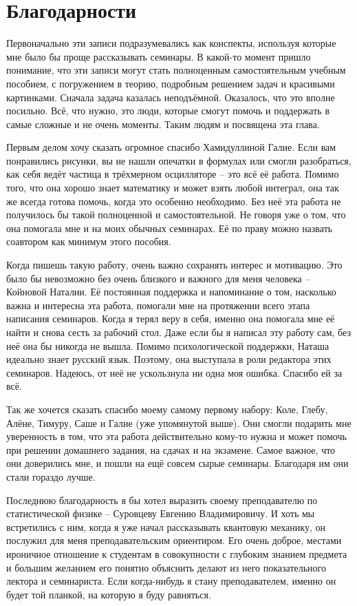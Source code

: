 \section*{Благодарности}

Первоначально эти записи подразумевались как конспекты, используя которые мне
было бы проще рассказывать семинары. В какой-то момент пришло понимание, что
эти записи могут стать полноценным самостоятельным учебным пособием, с
погружением в теорию, подробным решением задач и красивыми картинками. Сначала
задача казалась неподъёмной. Оказалось, что это вполне посильно. Всё, что
нужно, это люди, которые смогут помочь и поддержать в самые сложные и не очень
моменты. Таким людям и посвящена эта глава.

Первым делом хочу сказать огромное спасибо Хамидуллиной Галие. Если вам
понравились рисунки, вы не нашли опечатки в формулах или смогли разобраться,
как себя ведёт частица в трёхмерном осцилляторе -- это всё её работа. Помимо
того, что она хорошо знает математику и может взять любой интеграл, она так же
всегда готова помочь, когда это особенно необходимо. Без неё эта работа не
получилось бы такой полноценной и самостоятельной. Не говоря уже о том, что она
помогала мне и на моих обычных семинарах. Её по праву можно назвать соавтором
как минимум этого пособия.

Когда пишешь такую работу, очень важно сохранять интерес и мотивацию. Это было
бы невозможно без очень близкого и важного для меня человека -- Койновой
Наталии. Её постоянная поддержка и напоминание о том, насколько важна и
интересна эта работа, помогали мне на протяжении всего этапа написания
семинаров. Когда я терял веру в себя, именно она помогала мне её найти и снова
сесть за рабочий стол. Даже если бы я написал эту работу сам, без неё она бы
никогда не вышла. Помимо психологической поддержки, Наташа идеально знает
русский язык. Поэтому, она выступала в роли редактора этих семинаров. Надеюсь,
от неё не ускользнула ни одна моя ошибка. Спасибо ей за всё.

Так же хочется сказать спасибо моему самому первому набору: Коле, Глебу, Алёне,
Тимуру, Саше и Галие (уже упомянутой выше). Они смогли подарить мне уверенность
в том, что эта работа действительно кому-то нужна и может помочь при решении
домашнего задания, на сдачах и на экзамене. Самое важное, что они доверились
мне, и пошли на ещё совсем сырые семинары. Благодаря им они стали гораздо
лучше.

Последнюю благодарность я бы хотел выразить своему преподавателю по
статистической физике -- Суровцеву Евгению Владимировичу. И хоть мы встретились
с ним, когда я уже начал рассказывать квантовую механику, он послужил для меня
преподавательским ориентиром. Его очень доброе, местами ироничное отношение к
студентам в совокупности с глубоким знанием предмета и большим желанием его
понятно объяснить делают из него показательного лектора и семинариста. Если
когда-нибудь я стану преподавателем, именно он будет той планкой, на которую я
буду равняться.